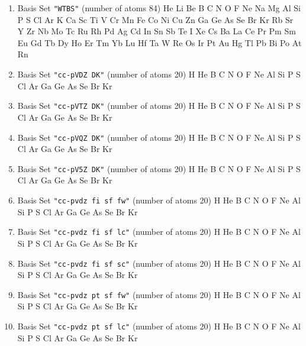 \begin{enumerate}
\item Basis Set \verb#"WTBS"# (number of atoms 84)  \newline 
  He Li Be B C N O F Ne Na Mg Al Si P S Cl Ar K Ca Sc Ti V Cr Mn Fe
 Co Ni Cu Zn Ga Ge As Se Br Kr Rb Sr Y Zr Nb Mo Tc Ru Rh Pd Ag Cd In Sn Sb
 Te I Xe Cs Ba La Ce Pr Pm Sm Eu Gd Tb Dy Ho Er Tm Yb Lu Hf Ta W Re Os Ir
 Pt Au Hg Tl Pb Bi Po At Rn


\item Basis Set \verb#"cc-pVDZ DK"# (number of atoms 20)  \newline 
  H He B C N O F Ne Al Si P S Cl Ar Ga Ge As Se Br Kr


\item Basis Set \verb#"cc-pVTZ DK"# (number of atoms 20)  \newline 
  H He B C N O F Ne Al Si P S Cl Ar Ga Ge As Se Br Kr


\item Basis Set \verb#"cc-pVQZ DK"# (number of atoms 20)  \newline 
  H He B C N O F Ne Al Si P S Cl Ar Ga Ge As Se Br Kr


\item Basis Set \verb#"cc-pV5Z DK"# (number of atoms 20)  \newline 
  H He B C N O F Ne Al Si P S Cl Ar Ga Ge As Se Br Kr


\item Basis Set \verb#"cc-pvdz fi sf fw"# (number of atoms 20)  \newline 
  H He B C N O F Ne Al Si P S Cl Ar Ga Ge As Se Br Kr


\item Basis Set \verb#"cc-pvdz fi sf lc"# (number of atoms 20)  \newline 
  H He B C N O F Ne Al Si P S Cl Ar Ga Ge As Se Br Kr


\item Basis Set \verb#"cc-pvdz fi sf sc"# (number of atoms 20)  \newline 
  H He B C N O F Ne Al Si P S Cl Ar Ga Ge As Se Br Kr


\item Basis Set \verb#"cc-pvdz pt sf fw"# (number of atoms 20)  \newline 
  H He B C N O F Ne Al Si P S Cl Ar Ga Ge As Se Br Kr


\item Basis Set \verb#"cc-pvdz pt sf lc"# (number of atoms 20)  \newline 
  H He B C N O F Ne Al Si P S Cl Ar Ga Ge As Se Br Kr



\end{enumerate}
